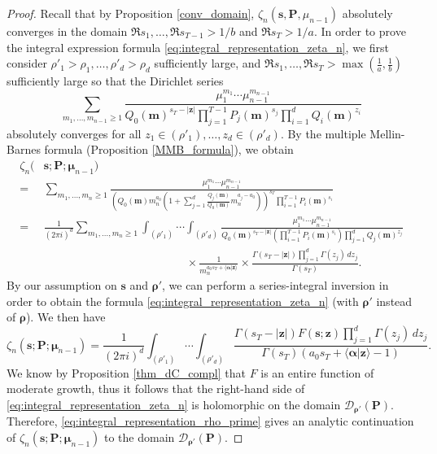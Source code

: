\documentclass[a4paper,12pt]{article}
\theoremstyle{definition}
\numberwithin{equation}{section}
\newcommand{\dd}{d}
\newcommand{\ii}{i}
\begin{document}
\begin{proof}
Recall that by Proposition \ref{conv_domain}, $\zeta_n(\mathbf{s}, \mathbf{P}, \mu_{n-1})$ absolutely converges in the domain $\Re s_1,\ldots,\Re s_{T-1}> 1/b$ and $\Re s_T> 1/a$. In order to prove the integral expression formula \eqref{eq:integral_representation_zeta_n}, we first consider $\rho'_1>\rho_1,\ldots,\rho'_d>\rho_d$ sufficiently large, and $\Re s_1,\ldots,\Re s_T>\max ( \frac{1}{a}, \frac{1}{b})$ sufficiently large so that the Dirichlet series
$$ \sum_{m_1,\ldots,m_{n-1} \geq 1} \frac{\mu_1^{m_1}\cdots \mu_{n-1}^{m_{n-1}}}{Q_0(\mathbf{m})^{s_T-|\mathbf{z}|}\prod_{j=1}^{T-1}P_j(\mathbf{m})^{s_j}\prod_{i=1}^d Q_i(\mathbf{m})^{z_i}} $$
absolutely converges for all $z_1 \in (\rho'_1),\ldots, z_d \in (\rho'_d)$. By the multiple Mellin-Barnes formula
(Proposition \ref{MMB_formula}), we obtain
\begin{align*}
    \zeta_{n}(&\mathbf{s};\mathbf{P};\boldsymbol{\mu}_{n-1}) \\
    =& \sum_{m_1,\ldots,m_n \geq 1} \frac{\mu_1^{m_1} \cdots \mu_{n-1}^{m_{n-1}}}{\left(Q_0(\mathbf{m})m_n^{a_0}\left(1+\sum_{j=1}^d \frac{Q_j(\mathbf{m})}{Q_0(\mathbf{m})}m_n^{a_j-a_0}\right)\right)^{s_T} \prod_{i=1}^{T-1} P_i(\mathbf{m})^{s_i}} \\
    =& \frac{1}{(2\pi \ii)^d}\sum_{m_1,\ldots,m_n \geq 1} \int_{(\rho'_1)} \cdots \int_{(\rho'_d)} \frac{\mu_1^{m_1}\cdots \mu_{n-1}^{m_{n-1}}}{Q_0(\mathbf{m})^{s_T-|\mathbf{z}|} \left(\prod_{i=1}^{T-1} P_i(\mathbf{m})^{s_i}\right) \prod_{j=1}^d Q_j(\mathbf{m})^{z_j}} \\
    & \hspace{150pt} \times \frac{1}{m_n^{a_0s_T+\langle \boldsymbol{\alpha}|\mathbf{z} \rangle}} \times \frac{\Gamma(s_T-|\mathbf{z}|)\prod_{j=1}^d \Gamma(z_j) \, \dd z_j}{\Gamma(s_T)}.
\end{align*}
By our assumption on $\mathbf{s}$ and $\boldsymbol{\rho}'$, we can perform a series-integral inversion in order to obtain the formula \eqref{eq:integral_representation_zeta_n} (with $\boldsymbol{\rho}'$ instead of $\boldsymbol{\rho}$). We then have
\begin{equation}
    \zeta_{n}(\mathbf{s};\mathbf{P};\boldsymbol{\mu}_{n-1}) = \frac{1}{(2 \pi \ii)^d} \int_{(\rho'_1)} \cdots \int_{(\rho'_d)} \frac{\Gamma(s_T-|\mathbf{z}|)F(\mathbf{s};\mathbf{z}) \prod_{j=1}^d \Gamma(z_j) \, \dd z_j }{\Gamma(s_T)(a_0s_T+\langle \boldsymbol{\alpha}|\mathbf{z} \rangle-1)}. \label{eq:integral_representation_rho_prime}
\end{equation}
We know by Proposition \ref{thm_dC_compl} that $F$ is an entire function of moderate growth, thus it follows that the right-hand side of \eqref{eq:integral_representation_zeta_n} is holomorphic on the domain $\mathcal{D}_{\boldsymbol{\rho}'}(\mathbf{P})$. Therefore, \eqref{eq:integral_representation_rho_prime} gives an analytic continuation of $\zeta_{n}(\mathbf{s};\mathbf{P};\boldsymbol{\mu}_{n-1})$ to the domain $\mathcal{D}_{\boldsymbol{\rho}'}(\mathbf{P})$.


\end{proof}
\end{document}

